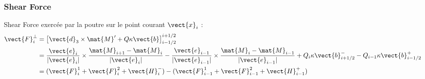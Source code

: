 \subsubsection{Shear Force}

Shear Force exercée par la poutre sur le point courant $\vect{x}_i$ :
\begin{equation}
	\begin{aligned}
	\vect{F}_i^{\perp}
	&= \left[\vect{d}_3 \times \mat{M}' + Q\kappa\vect{b} \right]_{i-1/2}^{i+1/2} \\
	&= 	\frac{\vect{e}_i}{|\vect{e}_i|} \times \frac{\mat{M}_{i+1} - \mat{M}_{i}}{|\vect{e}_i|}
		- \frac{\vect{e}_{i-1}}{|\vect{e}_{i-1}|} \times \frac{\mat{M}_{i} - \mat{M}_{i-1}}{|\vect{e}_{i-1}|}
		+ Q_i\kappa\vect{b}^{-}_{i+1/2}
		- Q_{i-1}\kappa\vect{b}^{+}_{i-1/2}\\
	&= (\vect{F}^1_{i} + \vect{F}^2_{i} + \vect{H}^{-}_{i}) - (\vect{F}^1_{i-1} + \vect{F}^2_{i-1} +  \vect{H}^{+}_{i-1})
	\end{aligned}
\end{equation}

